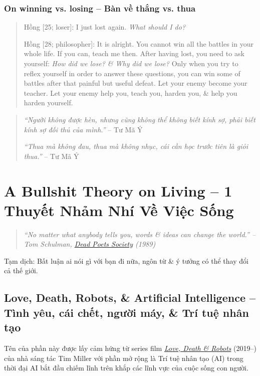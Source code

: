 \documentclass[12pt]{article}
\begin{document}
\subsubsection{On winning vs. losing -- Bàn về thắng vs. thua}

\begin{quote}
	{\sf Hồng [25; loser]}: I just lost again. {\it What should I do?}
	
	{\sf Hồng [28; philosopher]}: It is alright. You cannot win all the battles in your whole life. If you can, teach me then. After having lost, you need to ask yourself: {\it How did we lose? \& Why did we lose?} Only when you try to reflex yourself in order to answer these questions, you can win some of battles after that painful but useful defeat. Let your enemy become your teacher. Let your enemy help you, teach you, harden you, \& help you harden yourself.
\end{quote}

\begin{quotation}
	{\it``Người không được hèn, nhưng cũng không thể không biết kính sợ, phải biết kính sợ đối thủ của mình.''} -- {\sc Tư Mã Ý}
	
	{\it``Thua mà không đau, thua mà không nhục, cái cần học trước tiên là giỏi thua.''} -- {\sc Tư Mã Ý}
\end{quotation}


\section{A Bullshit Theory on Living -- 1 Thuyết Nhảm Nhí Về Việc Sống}
\label{sect: bullshit theory on live}

\begin{quotation}\it
	``No matter what anybody tells you, words \& ideas can change the world.'' -- {\sc Tom Schulman}, \href{https://www.imdb.com/title/tt0097165}{Dead Poets Society} (1989)
\end{quotation}
{\sf Tạm dịch}: Bất luận ai nói gì với bạn đi nữa, ngôn từ \& ý tưởng có thể thay đổi cả thế giới.

\subsection{Love, Death, Robots, \& Artificial Intelligence -- Tình yêu, cái chết, người máy, \& Trí tuệ nhân tạo}
Tên của phần này được lấy cảm hứng từ series film \href{https://www.imdb.com/title/tt9561862}{\it Love, Death \& Robots} (2019--) của nhà sáng tác {\sc Tim Miller} với phần mở rộng là Trí tuệ nhân tạo (AI) trong thời đại AI bắt đầu chiếm lĩnh trên khắp các lĩnh vực của cuộc sống con người.
\end{document}
